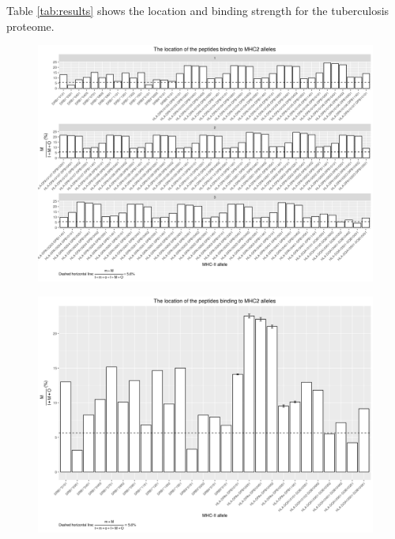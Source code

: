 \documentclass{article}
\begin{document}
\iffalse
	Table \ref{tab:results} shows the location and binding strength for the
	tuberculosis proteome.

	\begin{figure}[ht]
	  \includegraphics[width=\textwidth]{figure_1.png}
	  \label{fig:1}
	\end{figure}

	\begin{figure}[ht]
	  \includegraphics[width=\textwidth]{figure_1_5.png}
	  \label{fig:1_5}
	\end{figure}
\end{document}
